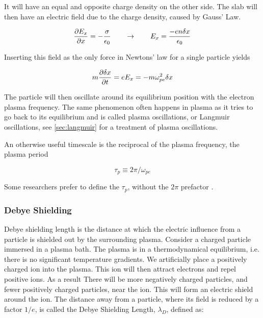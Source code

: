 		It will have an equal and opposite charge density on the other side. The slab
		will then have an electric field due to the charge density, caused by Gauss' Law.

		\begin{equation}
			\pdv{E_x}{x} = -\frac{\sigma}{\epsilon_0} \qquad\rightarrow\qquad
			E_x = \frac{-en\delta x}{\epsilon_0}
		\end{equation}

		Inserting this field as the only force in Newtons' law for a single particle yields

		\begin{equation}
			m\pdv{\delta x}{t} = eE_x = -m\omega_{pe}^2\delta x
		\end{equation}

		The particle will then oscillate around its equilibrium position with
		the electron plasma frequency. The same phenomenon often happens in plasma as
		it tries to go back to its equilibrium and is called plasma oscillations,
		or Langmuir oscillations, see \cref{sec:langmuir} for a treatment of plasma oscillations.

		An otherwise useful timescale is the reciprocal of the plasma frequency,
		the plasma period

		\begin{equation}
			\tau_p \equiv 2\pi/\omega_{pe}
		\end{equation}

		Some researchers prefer to define the \(\tau_p\), without the \(2\pi\) prefactor \citep{fitzpatrick_plasma_2014}.

		\subsubsection{Debye Shielding}
		Debye shielding length is the distance at which the electric influence
		from a particle is shielded out by the surrounding plasma.
		Consider a charged particle immersed in a plasma bath. The plasma is in
		a thermodynamical equilibrium, i.e. there is no significant temperature
		gradients. We artificially place a positively charged ion into the plasma.
		This ion will then attract electrons and repel positive ions. As a result There will
		be more negatively charged particles, and fewer positively charged particles, near the
		ion. This will form an electric shield around the ion. The
		distance away from a particle, where its field is reduced by a factor \(1/e\),
		is called the Debye Shielding Length, \(\lambda_D\), defined as:

